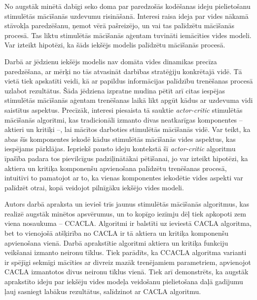 \documentclass{ludis} %
\begin{document}
No augstāk minētā dabīgi seko doma par paredzošās kodēšanas ideju pielietošanu
stimulētās mācīšanās uzdevumu risināšanā. Interesi raisa ideja par vides nākamā
stāvokļa paredzēšanu, ņemot vērā pašreizējo, un vai tas palīdzētu mācīšanās
procesā. Tas liktu stimulētās mācīšanās aģentam tuvināti iemācīties vides
modeli. Var izteikt hipotēzi, ka šāds iekšējs modelis palīdzētu
mācīšanās procesā.

Darbā ar jēdzienu iekšējs modelis nav domāta vides dinamikas precīza
paredzēšana, ar mērķi no tās atvasināt darbības stratēģiju konkrētajā vidē. Tā
vietā tiek apskatīti veidi, kā ar papildus informācijas palīdzību trenēšanas
procesā uzlabot rezultātus. Šāda jēdziena izpratne mudina pētīt arī citas
iespējas stimulētās mācīšanās aģentam trenēšanas laikā likt apgūt kādus ar
uzdevuma vidi saistītus aspektus. Precīzāk, interesi piesaista tā sauktie
\textit{actor-critic} stimulētās mācīšanās algoritmi, kas tradicionāli izmanto
divas neatkarīgas komponentes -- aktieri un kritiķi --, lai mācītos darboties
stimulētās mācīšanās vidē. Var teikt, ka abas šīs komponentes iekodē kādus
stimulētās mācīšanās vides aspektus, kas iespējams pārklājas. Iepriekš pausto
ideju kontekstā šī \textit{actor-critic} algoritmu īpašība padara tos
pievilcīgus padziļinātākai pētīšanai, jo var izteikt hipotēzi, ka aktiera un
kritiķa komponenšu apvienošana palīdzētu trenēšanas procesā, intuitīvi to
pamatojot ar to, ka vienas komponentes iekodētie vides aspekti var palīdzēt
otrai, kopā veidojot pilnīgāku iekšējo vides modeli.


Autors darbā apraksta un ievieš trīs jaunus stimulētās mācīšanās algoritmus, kas
realizē augstāk minētos apsvērumus, un to kopīgo iezīmju dēļ tiek apkopoti zem
viena nosaukuma -- CCACLA. Algoritmi ir balstīti uz \autocite{Hasselt2009}
ieviestā CACLA algoritma, bet to vienojošā atšķirība no CACLA ir tā aktiera un
kritiķa komponenšu apvienošana vienā. Darbā aprakstītie algoritmi aktiera un
kritiķa funkciju veikšanai izmanto neironu tīklus. Tiek parādīts, ka CCACLA
algoritma varianti ir spējīgi sekmīgi mācīties ar divreiz mazāk trenējamiem
parametriem, apvienojot CACLA izmantotos divus neironu tīklus vienā. Tiek arī
demonstrēts, ka augstāk aprakstīto ideju par iekšēju vides modeļa veidošanu
pielietošana daļā gadījumu ļauj sasniegt labākus rezultātus, salīdzinot ar CACLA
algoritmu.
\end{document}
